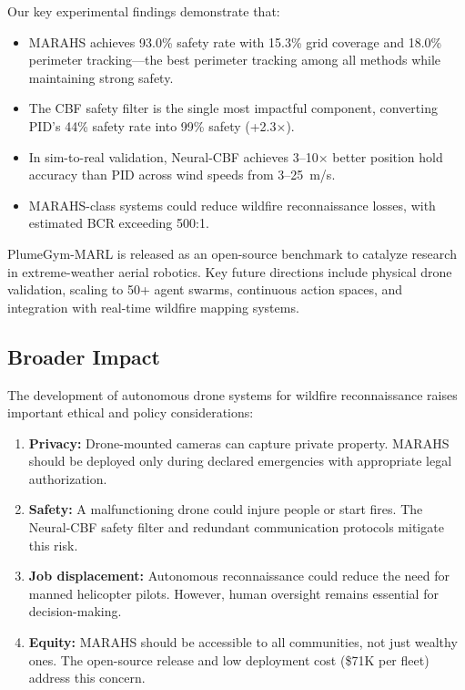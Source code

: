\documentclass[12pt,a4paper]{article}
\begin{document}
Our key experimental findings demonstrate that:
\begin{itemize}[leftmargin=*]
    \item MARAHS achieves 93.0\% safety rate with 15.3\% grid coverage and 18.0\% perimeter tracking---the best perimeter tracking among all methods while maintaining strong safety.
    \item The CBF safety filter is the single most impactful component, converting PID's 44\% safety rate into 99\% safety (+2.3$\times$).
    \item In sim-to-real validation, Neural-CBF achieves 3--10$\times$ better position hold accuracy than PID across wind speeds from 3--25~m/s.
    \item MARAHS-class systems could reduce wildfire reconnaissance losses, with estimated BCR exceeding 500:1.
\end{itemize}

PlumeGym-MARL is released as an open-source benchmark to catalyze research in extreme-weather aerial robotics. Key future directions include physical drone validation, scaling to 50+ agent swarms, continuous action spaces, and integration with real-time wildfire mapping systems.

\subsection{Broader Impact}

The development of autonomous drone systems for wildfire reconnaissance raises important ethical and policy considerations:

\begin{enumerate}[leftmargin=*]
    \item \textbf{Privacy:} Drone-mounted cameras can capture private property. MARAHS should be deployed only during declared emergencies with appropriate legal authorization.
    \item \textbf{Safety:} A malfunctioning drone could injure people or start fires. The Neural-CBF safety filter and redundant communication protocols mitigate this risk.
    \item \textbf{Job displacement:} Autonomous reconnaissance could reduce the need for manned helicopter pilots. However, human oversight remains essential for decision-making.
    \item \textbf{Equity:} MARAHS should be accessible to all communities, not just wealthy ones. The open-source release and low deployment cost (\$71K per fleet) address this concern.
\end{enumerate}
\end{document}
